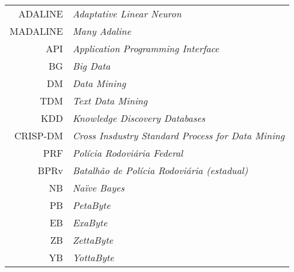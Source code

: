 \vspace*{12pt}

\noindent

\vspace{1em}

\begin{tabular}{r  l}
 ADALINE & \textit{Adaptative Linear Neuron}\\
 MADALINE & \textit{Many Adaline}\\
 API & \textit{Application Programming Interface}\\
 BG & \textit{Big Data}\\
 DM & \textit{Data Mining}\\
 TDM & \textit{Text Data Mining}\\
 KDD & \textit{Knowledge Discovery Databases}\\
 CRISP-DM & \textit{Cross Insdustry Standard Process for Data Mining}\\
 PRF & \textit{Polícia Rodoviária Federal}\\
 BPRv & \textit{Batalhão de Polícia Rodoviária (estadual)}\\
 NB & \textit{Naïve Bayes}\\

 PB & \textit{PetaByte}\\
 EB & \textit{ExaByte}\\
 ZB & \textit{ZettaByte}\\
 YB & \textit{YottaByte}\\
 
\end{tabular}


